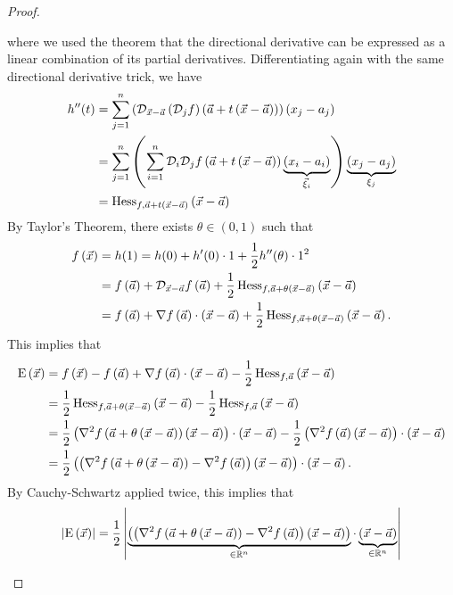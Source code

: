 \documentclass[main.tex]{subfiles}
\begin{document}
\begin{proof}
\begin{enumerate}
        where we used the theorem that the directional derivative can be expressed as a linear combination of its partial derivatives. Differentiating again with the same directional derivative trick, we have
        \begin{align*}
            h''(t) &= \sum_{j = 1}^n \left( \mathcal{D}_{\vec{x} - \vec{a}}\left( \mathcal{D}_jf \right)\left( \vec{a} + t\left( \vec{x} - \vec{a} \right) \right) \right)\left( x_j - a_j \right) \\
            &= \sum_{j = 1}^n\left( \sum_{i = 1}^n \mathcal{D}_i\mathcal{D}_jf\left( \vec{a} + t\left( \vec{x} - \vec{a} \right) \right)\underbrace{\left( x_i - a_i \right)}_{\vec\xi_i} \right)\underbrace{\left( x_j - a_j \right)}_{\xi_j} \\
            &= \operatorname{Hess}_{f, \vec{a} + t\left( \vec{x} - \vec{a} \right)} \left( \vec{x} - \vec{a} \right)
        \end{align*}
        By Taylor's Theorem, there exists $\theta\in (0, 1)$ such that
        \begin{align*}
            f\left( \vec{x} \right) &= h(1) = h(0) + h'(0) \cdot 1 + \frac{1}{2}h''(\theta) \cdot 1^2 \\
            &= f\left( \vec{a} \right) + \mathcal{D}_{\vec{x} - \vec{a}}f\left( \vec{a} \right) + \frac{1}{2}\operatorname{Hess}_{f, \vec{a} + \theta\left( \vec{x} - \vec{a} \right)} \left( \vec{x} - \vec{a} \right) \\
            &= f\left( \vec{a} \right) + \nabla f\left( \vec{a} \right) \cdot \left( \vec{x} - \vec{a} \right) + \frac{1}{2}\operatorname{Hess}_{f, \vec{a} + \theta\left( \vec{x} - \vec{a} \right)} \left( \vec{x} - \vec{a} \right).
        \end{align*}
        This implies that
        \begin{align*}
            \mathrm{E}\left( \vec{x} \right) &= f\left( \vec{x} \right) - f\left( \vec{a} \right) + \nabla f\left( \vec{a} \right) \cdot \left( \vec{x} - \vec{a} \right) - \frac{1}{2}\operatorname{Hess}_{f, \vec{a}} \left( \vec{x} - \vec{a} \right) \\
            &= \frac{1}{2}\operatorname{Hess}_{f, \vec{a} + \theta\left( \vec{x} - \vec{a} \right)} \left( \vec{x} - \vec{a} \right) - \frac{1}{2}\operatorname{Hess}_{f, \vec{a}} \left( \vec{x} - \vec{a} \right) \\
            &= \frac{1}{2}\left( \nabla^2 f\left( \vec{a} + \theta\left( \vec{x} - \vec{a} \right) \right)\left( \vec{x} - \vec{a} \right) \right) \cdot\left( \vec{x} - \vec{a} \right) - \frac{1}{2}\left( \nabla^2 f\left( \vec{a} \right) \left( \vec{x} - \vec{a} \right) \right)\cdot\left( \vec{x} - \vec{a} \right) \\
            &= \frac{1}{2}\left( \left( \nabla^2 f\left( \vec{a} + \theta\left( \vec{x} - \vec{a} \right) \right) - \nabla^2 f\left( \vec{a} \right) \right) \left( \vec{x} - \vec{a} \right) \right)\cdot\left( \vec{x} - \vec{a} \right).
        \end{align*}
        By Cauchy-Schwartz applied twice, this implies that
        \begin{align*}
            \abs{\mathrm{E}\parens{\vx}} &= \frac{1}{2}\abs{\underbrace{\parens{\parens{\nabla^2 f\parens{\va + \theta\parens{\vx - \va}} - \nabla^2 f\parens{\va}} \parens{\vx - \va}}}_{\in \RR^n}\cdot\underbrace{\parens{\vx - \va}}_{\in \RR^n}} \\

\end{align*}
\end{enumerate}
\end{proof}
\end{document}
